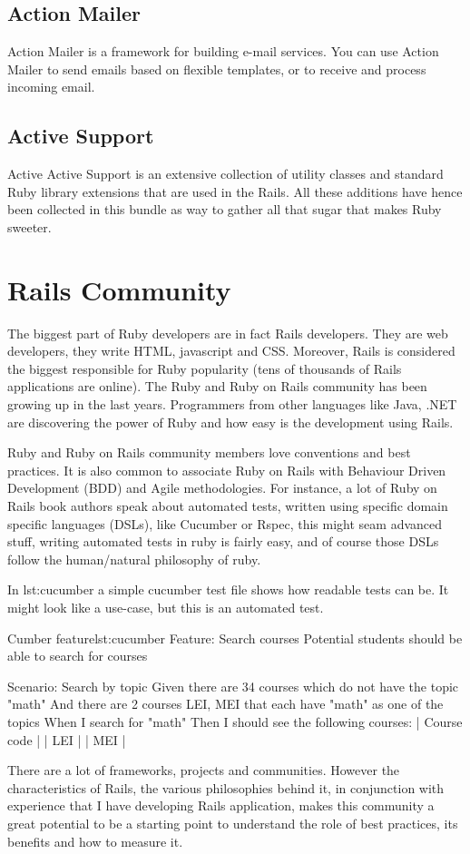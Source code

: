 \subsection{Action Mailer}  
Action Mailer is a framework for building e-mail services. You can use Action Mailer to send emails based on flexible templates, or to receive and process incoming email.

\subsection{Active Support} Active 
Active Support is an extensive collection of utility classes and standard Ruby library extensions that are used in the Rails. All these additions have hence been collected in this bundle as way to gather all that sugar that makes Ruby sweeter.


\section{Rails Community} 
The biggest part of Ruby developers are in fact Rails developers. 
They are web developers, they write HTML, javascript and CSS.
Moreover, Rails is considered the biggest responsible for Ruby popularity
(tens of thousands of Rails applications are online).
The Ruby and Ruby on Rails community has been growing up in the last years. 
Programmers from other languages like Java, .NET are discovering the power of Ruby and how easy is the development using Rails.

Ruby and Ruby on Rails community members love conventions and best practices.
It is also common to associate Ruby on Rails with Behaviour Driven Development (BDD) and Agile methodologies.
For instance, a lot of Ruby on Rails book authors speak about automated tests, 
written using specific domain specific languages (DSLs), like Cucumber or Rspec, 
this might seam advanced stuff, writing automated tests in ruby is fairly easy,
and of course those DSLs follow the human/natural philosophy of ruby.

In lst:cucumber a simple cucumber test file shows how readable tests can be.
It might look like a use-case, but this is an automated test.

\begin{rubycode}{Cumber feature}{lst:cucumber}
Feature: Search courses
  Potential students should be able to search for courses

  Scenario: Search by topic
    Given there are 34 courses which do not have the topic "math"
    And there are 2 courses LEI, MEI that each have "math" as one of the topics
    When I search for "math"
    Then I should see the following courses:
      | Course code |
      | LEI         |
      | MEI         |
\end{rubycode}

There are a lot of frameworks, projects and communities. 
However the characteristics of Rails, the various philosophies behind it,
in conjunction with experience that I have developing Rails application,
makes this community a great potential to be a starting point to understand the role of best practices, 
its benefits and how to measure it.

